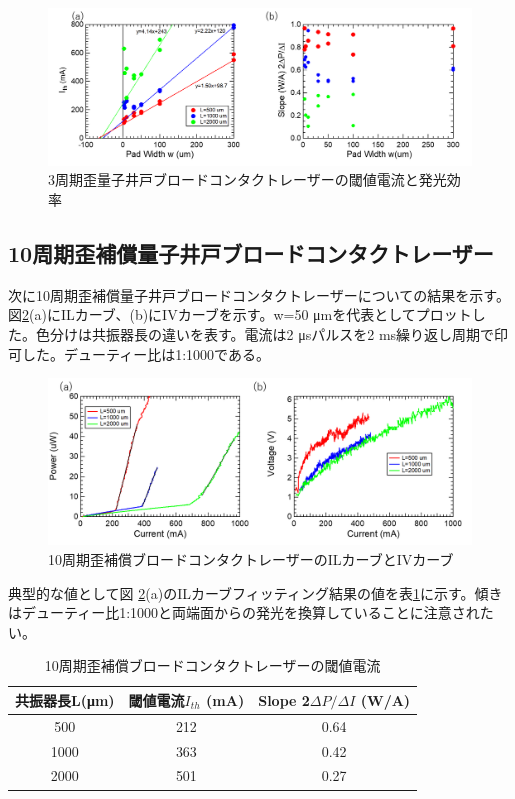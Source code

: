 \begin{figure}[h]
	\centering
	\includegraphics[width=15cm]{figure/fig_3_1_3QW_broadcontact_Ith.png}
		\caption{3周期歪量子井戸ブロードコンタクトレーザーの閾値電流と発光効率}
		\label{fig:fig_3_1_3QW_broadcontact_Ith}
\end{figure}
\clearpage
\subsection{10周期歪補償量子井戸ブロードコンタクトレーザー}%
次に10周期歪補償量子井戸ブロードコンタクトレーザーについての結果を示す。図\ref{fig:fig_3_1_10QW_broadcontact_IL}(a)にILカーブ、(b)にIVカーブを示す。w=50 \si{\micro\metre}を代表としてプロットした。色分けは共振器長の違いを表す。電流は2 \si{\micro s}パルスを2 ms繰り返し周期で印可した。デューティー比は1:1000である。
\begin{figure}[h]
	\centering
	\includegraphics[width=15cm]{figure/fig_3_1_10QW_broadcontact_IL.png}
		\caption{10周期歪補償ブロードコンタクトレーザーのILカーブとIVカーブ}
		\label{fig:fig_3_1_10QW_broadcontact_IL}
\end{figure}

典型的な値として図
\ref{fig:fig_3_1_10QW_broadcontact_IL}(a)のILカーブフィッティング結果の値を表\ref{table:table_3_1_10QW_broadcontact}に示す。傾きはデューティー比1:1000と両端面からの発光を換算していることに注意されたい。
\begin{table}[h]
  \caption{10周期歪補償ブロードコンタクトレーザーの閾値電流}
  \label{table:table_3_1_10QW_broadcontact}
  \centering
  \begin{tabular}{ccc}
    \hline
    共振器長L(\si{\micro\metre})  & 閾値電流$I_{th}$ (mA)  & Slope 2$\Delta P/\Delta I$ (W/A) \\
    \hline \hline
     500& 212&  0.64  \\
    1000& 363& 0.42\\
    2000& 501&0.27\\
       \hline
  \end{tabular}
\end{table}


